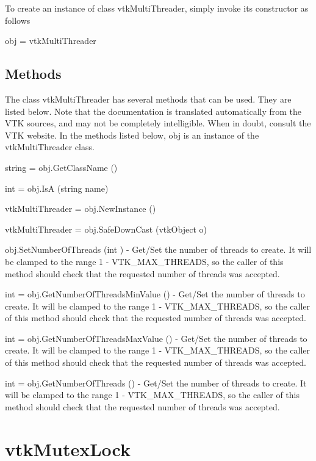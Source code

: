 To create an instance of class vtk\-Multi\-Threader, simply invoke its constructor as follows \begin{DoxyVerb}  obj = vtkMultiThreader
\end{DoxyVerb}
 \hypertarget{vtkwidgets_vtkxyplotwidget_Methods}{}\subsection{Methods}\label{vtkwidgets_vtkxyplotwidget_Methods}
The class vtk\-Multi\-Threader has several methods that can be used. They are listed below. Note that the documentation is translated automatically from the V\-T\-K sources, and may not be completely intelligible. When in doubt, consult the V\-T\-K website. In the methods listed below, {\ttfamily obj} is an instance of the vtk\-Multi\-Threader class. 
\begin{DoxyItemize}
\item {\ttfamily string = obj.\-Get\-Class\-Name ()}  
\item {\ttfamily int = obj.\-Is\-A (string name)}  
\item {\ttfamily vtk\-Multi\-Threader = obj.\-New\-Instance ()}  
\item {\ttfamily vtk\-Multi\-Threader = obj.\-Safe\-Down\-Cast (vtk\-Object o)}  
\item {\ttfamily obj.\-Set\-Number\-Of\-Threads (int )} -\/ Get/\-Set the number of threads to create. It will be clamped to the range 1 -\/ V\-T\-K\-\_\-\-M\-A\-X\-\_\-\-T\-H\-R\-E\-A\-D\-S, so the caller of this method should check that the requested number of threads was accepted.  
\item {\ttfamily int = obj.\-Get\-Number\-Of\-Threads\-Min\-Value ()} -\/ Get/\-Set the number of threads to create. It will be clamped to the range 1 -\/ V\-T\-K\-\_\-\-M\-A\-X\-\_\-\-T\-H\-R\-E\-A\-D\-S, so the caller of this method should check that the requested number of threads was accepted.  
\item {\ttfamily int = obj.\-Get\-Number\-Of\-Threads\-Max\-Value ()} -\/ Get/\-Set the number of threads to create. It will be clamped to the range 1 -\/ V\-T\-K\-\_\-\-M\-A\-X\-\_\-\-T\-H\-R\-E\-A\-D\-S, so the caller of this method should check that the requested number of threads was accepted.  
\item {\ttfamily int = obj.\-Get\-Number\-Of\-Threads ()} -\/ Get/\-Set the number of threads to create. It will be clamped to the range 1 -\/ V\-T\-K\-\_\-\-M\-A\-X\-\_\-\-T\-H\-R\-E\-A\-D\-S, so the caller of this method should check that the requested number of threads was accepted.  
\end{DoxyItemize}\hypertarget{vtkcommon_vtkmutexlock}{}\section{vtk\-Mutex\-Lock}\label{vtkcommon_vtkmutexlock}
